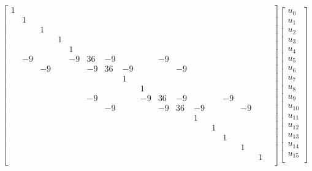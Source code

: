 \setcounter{MaxMatrixCols}{20}
\begin{equation}
\begin{bmatrix}
1  &    & &  &  &  & &  &  &  &  &  &  &   & &  \\
  &  1  & &  &  &  & &  &  &  &  &  &  &  & &  \\
  &     & 1 &  &  &  & &  &  &  &  &  &  &  & &  \\
  &     &  & 1 &  &  & &  &  &  &  &  &  &  & &  \\
  &     &  &  & 1 &  & &  &  &  &  &  &  &  & &  \\
  &  -9  &  &  & -9 &  36 & -9 &  &  & -9 &  &  &  &  & &  \\
  & &  -9  &  &  & -9 &  36 & -9 &  &  & -9 &  &  &  &  &   \\
  &     &  &  &  &  & & 1 &  &  &  &  &  &  & &  \\
  &     &  &  &  &  & &  & 1 &  &  &  &  &  & &  \\
  & & & & &  -9  &  &  & -9 &  36 & -9 &  &  & -9 &  &  &     \\
  & & & & & & -9  &  &  & -9 &  36 & -9 &  &  & -9 &  &       \\
  &     &  &  &  &  & &  &  &  &  & 1 &  &  & &  \\
  &     &  &  &  &  & &  &  &  &  &  & 1 &  & &  \\
  &     &  &  &  &  & &  &  &  &  &  &  & 1 & &  \\
  &     &  &  &  &  & &  &  &  &  &  &  &  & 1 &  \\
  &     &  &  &  &  & &  &  &  &  &  &  &  & & 1 \\
\end{bmatrix} 
\begin{bmatrix}
  u_{0}   \\
  u_{1}   \\
  u_{2}   \\
  u_{3}   \\
  u_{4}   \\
  u_{5}   \\
  u_{6}   \\
  u_{7}   \\
  u_{8}   \\
  u_{9}   \\
  u_{10}   \\
  u_{11}   \\
  u_{12}   \\
  u_{13}   \\
  u_{14}   \\
  u_{15}   \\

\end{bmatrix}
\end{equation}
